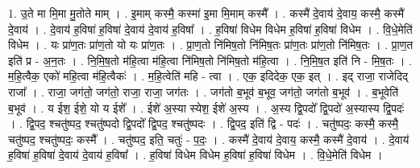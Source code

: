 \documentclass[17pt]{extarticle}
\begin{document}
1. उ॒ते मा मि॒मा मु॒तोते माम् । . इ॒माम् कस्मै॒ कस्मा॑ इ॒मा मि॒माम् कस्मै᳚ । . कस्मै॑ दे॒वाय॑ दे॒वाय॒ कस्मै॒ कस्मै॑ दे॒वाय॑ । . दे॒वाय॑ ह॒विषा॑ ह॒विषा॑ दे॒वाय॑ दे॒वाय॑ ह॒विषा᳚ । . ह॒विषा॑ विधेम विधेम ह॒विषा॑ ह॒विषा॑ विधेम । . वि॒धे॒मेति॑ विधेम । . यः प्रा॑ण॒तः प्रा॑ण॒तो यो यः प्रा॑ण॒तः । . प्रा॒ण॒तो नि॑मिष॒तो नि॑मिष॒तः प्रा॑ण॒तः प्रा॑ण॒तो नि॑मिष॒तः । . प्रा॒ण॒त इति॑ प्र - अ॒न॒तः । . नि॒मि॒ष॒तो म॑हि॒त्वा म॑हि॒त्वा नि॑मिष॒तो नि॑मिष॒तो म॑हि॒त्वा । . नि॒मि॒ष॒त इति॑ नि - मि॒ष॒तः । . म॒हि॒त्वैक॒ एको॑ महि॒त्वा म॑हि॒त्वैकः॑ । . म॒हि॒त्वेति॑ महि - त्वा । . एक॒ इदिदेक॒ एक॒ इत् । . इद् राजा॒ राजेदिद् राजा᳚ । . राजा॒ जग॑तो॒ जग॑तो॒ राजा॒ राजा॒ जग॑तः । . जग॑तो ब॒भूव॑ ब॒भूव॒ जग॑तो॒ जग॑तो ब॒भूव॑ । . ब॒भूवेति॑ ब॒भूव॑ । . य ईश॒ ईशे॒ यो य ईशे᳚ । . ईशे॑ अ॒स्या स्येश॒ ईशे॑ अ॒स्य । . अ॒स्य द्वि॒पदो᳚ द्वि॒पदो॑ अ॒स्यास्य द्वि॒पदः॑ । . द्वि॒पद॒ श्चतु॑ष्पद॒ श्चतु॑ष्पदो द्वि॒पदो᳚ द्वि॒पद॒ श्चतु॑ष्पदः । . द्वि॒पद॒ इति॑ द्वि - पदः॑ । . चतु॑ष्पदः॒ कस्मै॒ कस्मै॒ चतु॑ष्पद॒ श्चतु॑ष्पदः॒ कस्मै᳚ । . चतु॑ष्पद॒ इति॒ चतुः॑ - प॒दः॒ । . कस्मै॑ दे॒वाय॑ दे॒वाय॒ कस्मै॒ कस्मै॑ दे॒वाय॑ । . दे॒वाय॑ ह॒विषा॑ ह॒विषा॑ दे॒वाय॑ दे॒वाय॑ ह॒विषा᳚ । . ह॒विषा॑ विधेम विधेम ह॒विषा॑ ह॒विषा॑ विधेम । . वि॒धे॒मेति॑ विधेम । \newline
\end{document}
